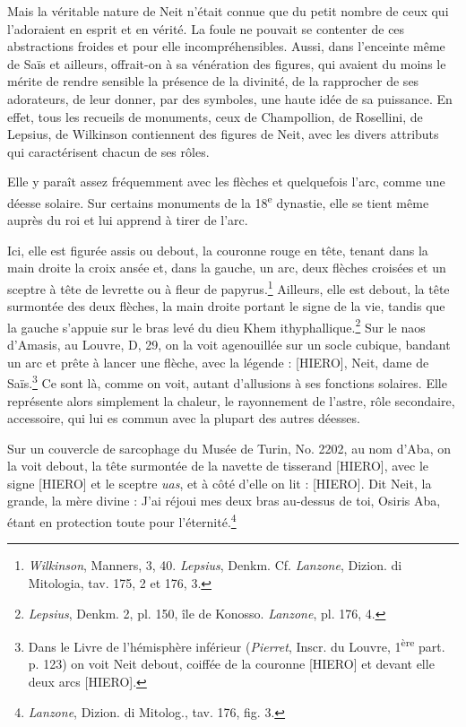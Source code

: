 \documentclass[a4paper, 11pt, oneside]{article}
\begin{document}
Mais la véritable nature de Neit n'était connue que du petit nombre de ceux qui l'adoraient en esprit et en vérité. La foule ne pouvait se contenter de ces abstractions froides et pour elle incompréhensibles. Aussi, dans l'enceinte même de Saïs et ailleurs, offrait-on à sa vénération des figures, qui avaient du moins le mérite de rendre sensible la présence de la divinité, de la rapprocher de ses adorateurs, de leur donner, par des symboles, une haute idée de sa puissance. En effet, tous les recueils de monuments, ceux de Champollion, de Rosellini, de Lepsius, de Wilkinson contiennent des figures de Neit, avec les divers attributs qui caractérisent chacun de ses rôles.

Elle y paraît assez fréquemment avec les flèches et quelquefois l'arc, comme une déesse solaire. Sur certains monuments de la 18\textsuperscript{e} dynastie, elle se tient même auprès du roi et lui apprend à tirer de l'arc.

Ici, elle est figurée assis ou debout, la couronne rouge en tête, tenant dans la main droite la croix ansée et, dans la gauche, un arc, deux flèches croisées et un sceptre à tête de levrette ou à fleur de papyrus.\footnote{\emph{Wilkinson}, Manners, 3, 40. \emph{Lepsius}, Denkm. Cf. \emph{Lanzone}, Dizion. di Mitologia, tav. 175, 2 et 176, 3.} Ailleurs, elle est debout, la tête surmontée des deux flèches, la main droite portant le signe de la vie, tandis que la gauche s'appuie sur le bras levé du dieu Khem ithyphallique.\footnote{\emph{Lepsius}, Denkm. 2, pl. 150, île de Konosso. \emph{Lanzone}, pl. 176, 4.} Sur le naos d'Amasis, au Louvre, D, 29, on la voit agenouillée sur un socle cubique, bandant un arc et prête à lancer une flèche, avec la légende : [HIERO], Neit, dame de Saïs.\footnote{Dans le Livre de l'hémisphère inférieur (\emph{Pierret}, Inscr. du Louvre, 1\textsuperscript{ère} part. p. 123) on voit Neit debout, coiffée de la couronne [HIERO] et devant elle deux arcs [HIERO].} Ce sont là, comme on voit, autant d'allusions à ses fonctions solaires. Elle représente alors simplement la chaleur, le rayonnement de l'astre, rôle secondaire, accessoire, qui lui es commun avec la plupart des autres déesses.

Sur un couvercle de sarcophage du Musée de Turin, No. 2202, au nom d'Aba, on la voit debout, la tête surmontée de la navette de tisserand [HIERO], avec le signe [HIERO] et le sceptre \emph{uas}, et à côté d'elle on lit : [HIERO]. Dit Neit, la grande, la mère divine : J'ai réjoui mes deux bras au-dessus de toi, Osiris Aba, étant en protection toute pour l'éternité.\footnote{\emph{Lanzone}, Dizion. di Mitolog., tav. 176, fig. 3.}
\end{document}
